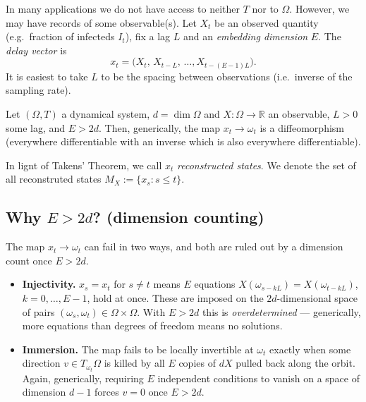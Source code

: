 In many applications we do not have access to neither $T$ nor to
$\Omega$. However, we may have records of some observable(s). Let
$X_t$ be an observed quantity (e.g.\ fraction of infecteds $I_t$), fix
a lag $L$ and an \emph{embedding dimension} $E$. The \emph{delay
vector} is
\[
x_t = \big(X_t,\,X_{t-L},\,\dots, X_{t-(E-1)L}\big).
\]
It is easiest to take $L$ to be the spacing between observations
(i.e.~inverse of the sampling rate).

\begin{theorem}[Takens, 1981]
Let $(\Omega, T)$ a dynamical system, $d=\dim \Omega$ and $X:\Omega
\to \mathbb{R}$ an observable, $L>0$ some lag, and $E>2d$. Then, generically, the
map $x_t \to \omega_t$ is a diffeomorphism (everywhere differentiable
with an inverse which is also everywhere differentiable). 
\end{theorem}
In lignt of Takens' Theorem, we call $x_t$ \emph{reconstructed
states}. We denote the set of all reconstruted states $M_X := \{x_s:
s\leq t\}$.

\subsection{Why $E>2d$? (dimension counting)}
The map $x_t\to\omega_t$ can fail in two ways, and both are ruled out
by a dimension count once $E>2d$.

\begin{itemize}
\item \textbf{Injectivity.} $x_s=x_t$ for $s\ne t$ means $E$ equations
  $X(\omega_{s-kL})=X(\omega_{t-kL})$, $k=0,\dots,E-1$, hold at once.
  These are imposed on the $2d$-dimensional space of pairs
  $(\omega_s,\omega_t)\in\Omega\times\Omega$. With $E>2d$ this is
  \emph{overdetermined} --- generically, more equations than degrees
  of freedom means no solutions.
\item \textbf{Immersion.} The map fails to be locally invertible at
  $\omega_t$ exactly when some direction $v\in T_{\omega_t}\Omega$ is
  killed by all $E$ copies of $dX$ pulled back along the orbit. Again,
  generically, requiring $E$ independent conditions to vanish on a
  space of dimension $d-1$ forces $v=0$ once $E>2d$.
\end{itemize}


